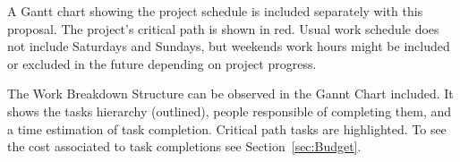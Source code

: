 
A Gantt chart showing the project schedule is included separately with this
proposal. The project's critical path is shown in red. Usual work schedule does
not include Saturdays and Sundays, but weekends work hours might be included or
excluded in the future depending on project progress.

The Work Breakdown Structure can be observed in the Gannt Chart included. It
shows the tasks hierarchy (outlined), people responsible of completing them, and
a time estimation of task completion. Critical path tasks are highlighted. To
see the cost associated to task completions see Section~\ref{sec:Budget}.
